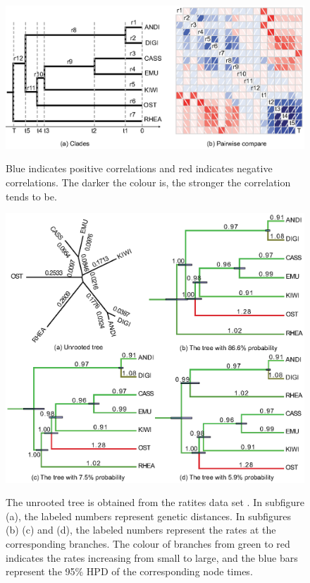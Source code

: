 \documentclass{bmcart}
\begin{document}
\begin{backmatter}
\begin{figure}[h!]
\includegraphics[width=12cm]{Fig16-correlation.eps}\\
\caption{
             Blue indicates positive correlations and red indicates negative correlations. The darker the colour is, the stronger the correlation tends to be.}
\label{correlation}
\end{figure}

\begin{figure}[h!]
\includegraphics[width=12cm]{Fig17-fixedtree.eps}\\
\caption{
            The unrooted tree is obtained from the ratites data set \cite{cooper2001complete}. In subfigure (a), the labeled numbers represent genetic distances. In subfigures (b) (c) and (d), the labeled numbers represent the rates at the corresponding branches. The colour of branches from green to red indicates the rates increasing from small to large, and the blue bars represent the 95\% HPD of the corresponding node times.}
\label{withoutdata}
\end{figure}


\end{backmatter}
\end{document}
